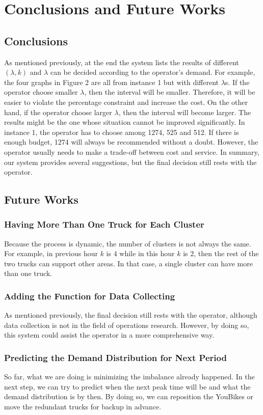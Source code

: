 \documentclass[a4paper, 12pt]{article}%
\theoremstyle{definition}
\begin{document}
\section{Conclusions and Future Works}

\subsection{Conclusions}
As mentioned previously, at the end the system lists the results of different $(\lambda, k)$ and $\lambda$ can be decided according to the operator’s demand. For example, the four graphs in Figure 2 are all from instance 1 but with different $\lambda$s. If the operator choose smaller $\lambda$, then the interval will be smaller. Therefore, it will be easier to violate the percentage constraint and increase the cost. On the other hand, if the operator choose larger $\lambda$, then the interval will become larger. The results might be the one whose situation cannot be improved significantly. In instance 1, the operator has to choose among 1274, 525 and 512. If there is enough budget, 1274 will always be recommended without a doubt. However, the operator usually needs to make a trade-off between cost and service. In summary, our system provides several suggestions, but the final decision still rests with the operator.

\subsection{Future Works}

\subsubsection{Having More Than One Truck for Each Cluster}
Because the process is dynamic, the number of clusters is not always the same. For example, in previous hour $k$ is $4$ while in this hour $k$ is $2$, then the rest of the two trucks can support other areas. In that case, a single cluster can have more than one truck.

\subsubsection{Adding the Function for Data Collecting}
As mentioned previously, the final decision still rests with the operator, although data collection is not in the field of operations research. However, by doing so, this system could assist the operator in a more comprehensive way.

\subsubsection{Predicting the Demand Distribution for Next Period}
So far, what we are doing is minimizing the imbalance already happened. In the next step, we can try to predict when the next peak time will be and what the demand distribution is by then. By doing so, we can reposition the YouBikes or move the redundant trucks for backup in advance.
\end{document}
